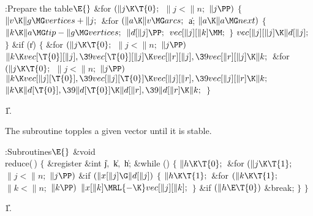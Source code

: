 \B{}:Prepare the  table\X${}\E{}$\6
\&{for} ${}(\|j\K\T{0};{}$ ${}\|j<\|n;{}$ ${}\|j\PP){}$\5
${}\{{}$\1\6
${}\|v\K\|g\MG\\{vertices}+\|j;{}$\6
\&{for} ${}(\|a\K\|v\MG\\{arcs};{}$ \|a; ${}\|a\K\|a\MG\\{next}){}$\5
${}\{{}$\1\6
${}\|k\K\|a\MG\\{tip}-\|g\MG\\{vertices};{}$\6
${}\|d[\|j]\PP;{}$\6
${}\\{vec}[\|j][\|k]\MM;{}$\6
\4${}\}{}$\2\6
${}\\{vec}[\|j][\|j]\K\|d[\|j];{}$\6
\4${}\}{}$\2\6
\&{if} (\|r)\5
${}\{{}$\1\6
\&{for} ${}(\|j\K\T{0};{}$ ${}\|j<\|n;{}$ ${}\|j\PP){}$\1\5
${}\|k\K\\{vec}[\T{0}][\|j],\39\\{vec}[\T{0}][\|j]\K\\{vec}[\|r][\|j],\39%
\\{vec}[\|r][\|j]\K\|k;{}$\2\6
\&{for} ${}(\|j\K\T{0};{}$ ${}\|j<\|n;{}$ ${}\|j\PP){}$\1\5
${}\|k\K\\{vec}[\|j][\T{0}],\39\\{vec}[\|j][\T{0}]\K\\{vec}[\|j][\|r],\39%
\\{vec}[\|j][\|r]\K\|k;{}$\2\6
${}\|k\K\|d[\T{0}],\39\|d[\T{0}]\K\|d[\|r],\39\|d[\|r]\K\|k;{}$\6
\4${}\}{}$\2\par
\U1.\fi

The  subroutine topples a given vector  until it is
stable.

\Y\B\4:Subroutines\X${}\E{}$\6
\&{void} \\{reduce}(\,)\1\1\2\2\6
${}\{{}$\1\6
\&{register} \&{int} \|j${},{}$ \|k${},{}$ \|h;\7
\&{while} ()\5
${}\{{}$\1\6
${}\|h\K\T{0};{}$\6
\&{for} ${}(\|j\K\T{1};{}$ ${}\|j<\|n;{}$ ${}\|j\PP){}$\1\6
\&{if} ${}(\|x[\|j]\G\|d[\|j]){}$\5
${}\{{}$\1\6
${}\|h\K\T{1};{}$\6
\&{for} ${}(\|k\K\T{1};{}$ ${}\|k<\|n;{}$ ${}\|k\PP){}$\1\5
${}\|x[\|k]\MRL{-{\K}}\\{vec}[\|j][\|k];{}$\2\6
\4${}\}{}$\2\2\6
\&{if} ${}(\|h\E\T{0}){}$\1\5
\&{break};\2\6
\4${}\}{}$\2\6
\4${}\}{}$\2\par
\U1.\fi

